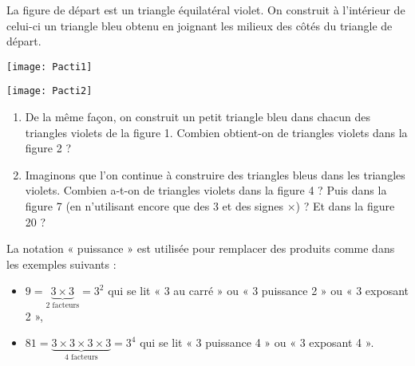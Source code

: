 \begin{activite}

\begin{partie}

\begin{minipage}{.62\linewidth}
La figure de départ est un triangle équilatéral violet. On construit à l'intérieur de celui-ci un triangle bleu obtenu en joignant les milieux des côtés du triangle de départ.
\end{minipage}\hfill%
\begin{minipage}{.35\linewidth}
\centering
\texttt{[image: Pacti1]}
\end{minipage}

\vspace{1em}

\begin{minipage}{.35\linewidth}
\centering
\texttt{[image: Pacti2]}
\end{minipage}\hfill%
\begin{minipage}{.62\linewidth}
\begin{enumerate}
\item De la même façon, on construit un petit triangle bleu dans chacun des triangles violets de la figure 1. Combien obtient-on de triangles violets dans la figure 2 ?
\item Imaginons que l'on continue à construire des triangles bleus dans les triangles violets. Combien a-t-on de triangles violets dans la figure 4 ? Puis dans la figure 7 (en n'utilisant encore que des 3 et des signes $\times$) ? Et dans la figure 20 ?
\end{enumerate}
\end{minipage}
\end{partie}

\vspace{1em}

\begin{partie}

La notation « puissance » est utilisée pour remplacer des produits comme dans les exemples suivants :
    \begin{itemize}
        \item $9 = \underbrace{3 \times 3}_{\text{2 facteurs}} = 3^2$ qui se lit « 3 au carré » ou « 3 puissance 2 » ou « 3 exposant 2 »,
        
        \item $81 = \underbrace{3 \times 3 \times 3 \times 3}_{\text{4 facteurs}}= 3^4$ qui se lit « 3 puissance 4 » ou « 3 exposant 4 ».
        

\end{itemize}
\end{partie}
\end{activite}
